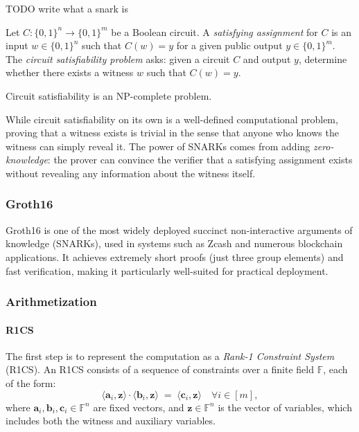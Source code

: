 TODO write what a snark is

\begin{definition}
Let $C: \{0,1\}^n \to \{0,1\}^m$ be a Boolean circuit. A \emph{satisfying assignment} for $C$ is an input $w \in \{0,1\}^n$ such that
$
C(w) = y
$
for a given public output $y \in \{0,1\}^m$. The \emph{circuit satisfiability problem} asks: given a circuit $C$ and output $y$, determine whether there exists a witness $w$ such that $C(w) = y$.
\end{definition}

\begin{remark}
Circuit satisfiability is an NP-complete problem.
\end{remark}

\begin{remark}
While circuit satisfiability on its own is a well-defined computational problem, 
proving that a witness exists is trivial in the sense that anyone who knows the witness 
can simply reveal it. The power of SNARKs comes from adding \emph{zero-knowledge}: 
the prover can convince the verifier that a satisfying assignment exists without revealing 
any information about the witness itself.
\end{remark}

\subsubsection{Groth16}

Groth16 \cite{groth2016} is one of the most widely deployed succinct non-interactive arguments of knowledge (SNARKs), 
used in systems such as Zcash and numerous blockchain applications. 
It achieves extremely short proofs (just three group elements) and fast verification, 
making it particularly well-suited for practical deployment. 

\subsubsection*{Arithmetization}

\paragraph{R1CS}
The first step is to represent the computation as a \emph{Rank-1 Constraint System} (R1CS).  
An R1CS consists of a sequence of constraints over a finite field $\mathbb{F}$, each of the form:
\[
\langle \mathbf{a}_i, \mathbf{z} \rangle \cdot 
\langle \mathbf{b}_i, \mathbf{z} \rangle \;=\; 
\langle \mathbf{c}_i, \mathbf{z} \rangle \quad \forall i \in [m],
\]
where $\mathbf{a}_i, \mathbf{b}_i, \mathbf{c}_i \in \mathbb{F}^n$ are fixed vectors, and $\mathbf{z} \in \mathbb{F}^n$ is the vector of variables, which includes both the witness and auxiliary variables.  

